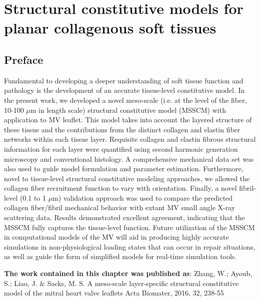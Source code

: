 \chapter{Structural constitutive models for planar collagenous soft tissues}


\section*{Preface}
%

    Fundamental to developing a deeper understanding of soft tissue function and pathology is the development of an accurate tissue-level constitutive model. In the present work, we developed a novel meso-scale (i.e. at the level of the fiber, 10-100 $\mu$m in length scale) structural constitutive model (MSSCM) with application to MV leaflet. This model takes into account the layered structure of these tissue and the contributions from the distinct collagen and elastin fiber networks within each tissue layer. Requisite collagen and elastin fibrous structural information for each layer were quantified using second harmonic generation microscopy and conventional histology. A comprehensive mechanical data set was also used to guide model formulation and parameter estimation. Furthermore, novel to tissue-level structural constitutive modeling approaches, we allowed the collagen fiber recruitment function to vary with orientation. Finally, a novel fibril-level (0.1 to 1 $\mu$m) validation approach was used to compare the predicted collagen fiber/fibril mechanical behavior with extant MV small angle X-ray scattering data. Results demonstrated excellent agreement, indicating that the MSSCM fully captures the tissue-level function. Future utilization of the MSSCM in computational models of the MV will aid in producing highly accurate simulations in non-physiological loading states that can occur in repair situations, as well as guide the form of simplified models for real-time simulation tools.

\textbf{The work contained in this chapter was published as}:  Zhang, W.; Ayoub, S.; Liao, J. \& Sacks, M. S.
A meso-scale layer-specific structural constitutive model of the mitral heart valve leaflets 
Acta Biomater, 2016, 32, 238-55 

























